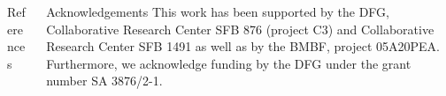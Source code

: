 \documentclass[t]{beamer}
\begin{document}
  \vspace*{\fill}
  \begin{columns}[onlytextwidth]%
    \begin{column}{0.75\textwidth}%
      \begin{alertblock}[equal height group=bottom, fonttitle=\normalsize]{References}
        \begin{multicols}{3}
          \footnotesize%
          \printbibliography%
        \end{multicols}
      \end{alertblock}
    \end{column}
    \begin{column}{0.25\textwidth}%
      \begin{alertblock}[equal height group=bottom, fonttitle=\normalsize]{Acknowledgements}
          \footnotesize%
          This work has been supported by the DFG, Collaborative Research Center SFB 876 (project C3) and Collaborative Research Center SFB 1491 as well as by the BMBF, project 05A20PEA.\\
          Furthermore, we acknowledge funding by the DFG under the grant number SA 3876/2-1.
      \end{alertblock}
    \end{column}
  \end{columns}

\end{document}
